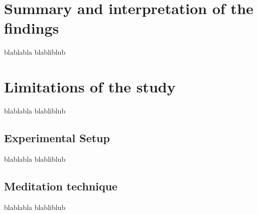 
\section{Summary and interpretation of the findings}

blablabla blabliblub

\section{Limitations of the study}

blablabla blabliblub

\subsection{Experimental Setup}

blablabla blabliblub

\subsection{Meditation technique}

blablabla blabliblub
